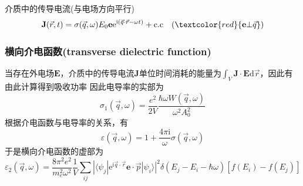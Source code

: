 {{介质中的传导电流(与电场方向平行)
\begin{displaymath}
	\mathbf{J}(\vec r,t)=\sigma(\vec q,\omega)E_0\mathbf{e}\mathrm{e}^{\mathrm{i}(\vec q\cdot\vec r-\omega t)}+\mathrm{c.c}\quad(\textcolor{red}{\mathbf{e}\bot\vec q})
\end{displaymath}
}

\frame
{
	\frametitle{横向介电函数\textrm{(transverse dielectric function)}}
	当存在外电场$\mathbf{E}$，介质中的传导电流$\mathbf{J}$单位时间消耗的能量为$\int_V\mathbf{J}\cdot\mathbf{E}\mathrm{d}\vec r$，因此有
由此计算得到吸收功率
{\fontsize{8.2pt}{6.2pt}}
因此电导率的实部为
\begin{displaymath}
	\sigma_1(\vec q,\omega)=\frac{e^2}{2V}\frac{\hbar\omega W(\vec q,\omega)}{\omega^2A_0^2}
\end{displaymath}
根据介电函数与电导率的关系，有
\begin{displaymath}
	\varepsilon(\vec q,\omega)=1+\frac{4\pi\mathrm{i}}{\omega}\sigma(\vec q,\omega)
\end{displaymath}
于是横向介电函数的虚部为
\begin{displaymath}
	\varepsilon_2(\vec q,\omega)=\frac{8\pi^2e^2}{m_e^2\omega^2}\frac1V\sum_{ij}|\langle\psi_j|\mathrm{e}^{\mathrm{i}\vec q\cdot\vec r}\mathbf{e}\cdot\vec p|\psi_i\rangle|^2\delta(E_j-E_i-\hbar\omega)[f(E_i)-f(E_j)]
\end{displaymath}
}

}
